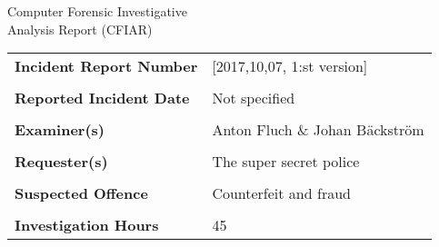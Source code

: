 


\setlength\headsep{50pt}
{\centering \Huge Computer Forensic Investigative \\Analysis Report (CFIAR)

}

\begin{longtable}{p{}p{}}
\textbf{Incident Report Number} & [2017,10,07, 1:st version] \\
&\\
\textbf{Reported Incident Date} & Not specified \\
&\\
\textbf{Examiner(s)} & Anton Fluch \& Johan Bäckström \\
&\\
\textbf{Requester(s)} & The super secret police \\
&\\
\textbf{Suspected Offence} & Counterfeit and fraud \\
&\\
\textbf{Investigation Hours} & 45
\end{longtable}

\clearpage

